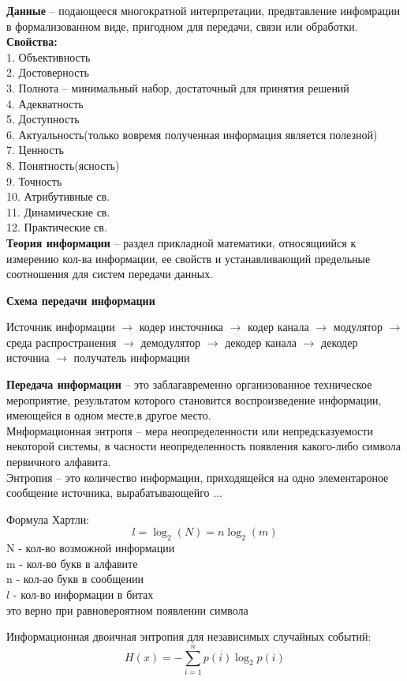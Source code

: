 \documentclass[a4paper, 12pt]{article}
\begin{document}
\textbf{Данные} -- подающееся многократной интерпретации, предвтавление инфомрации в формализованном виде, пригодном для передачи, связи или обработки.\\

\textbf{Свойства:}\\
1. Объективность\\
2. Достоверность\\
3. Полнота -- минимальный набор, достаточный для принятия решений\\
4. Адекватность \\
5. Доступность\\
6. Актуальность(только вовремя полученная информация является полезной)\\
7. Ценность\\
8. Понятность(ясность)\\
9. Точность\\
10. Атрибутивные св.\\
11. Динамические св.\\
12. Практические св.\\


\textbf{Теория информации} -- раздел прикладной математики, относящиийся к измерению кол-ва информации, ее свойств и устанавливающий предельные соотношения для систем передачи данных.\\
\begin{mdframed}[backgroundcolor=blue!20] 
       
  
\textbf{Схема передачи информации}

Источник информации $\to$ кодер инсточника $\to$ кодер канала $\to$ модулятор $\to$ среда распространения $\to$ демодулятор $\to$ декодер канала $\to$ декодер источниа $\to$ получатель информации
\end{mdframed}

\textbf{Передача информации} -- это заблагавременно организованное техническое мероприятие, результатом которого становится воспроизведение информации, имеющейся в одном месте,в другое место.\\

Мнформационная энтропя -- мера неопределенности или непредсказуемости некоторой системы, в часности неопределенность появления какого-либо символа первичного алфавита.\\
Энтропия -- это количество информации, приходящейся на одно элементароное сообщение источника, вырабатывающейго ...\\

\begin{mdframed}[backgroundcolor=blue!20] 
       Формула Хартли:\\
       \[l = \log_2 (N) = n \log_2 (m)\]
       N - кол-во возможной информации\\
       m - кол-во букв в алфавите\\
       n - кол-ао букв в сообщении\\
       $ l $ - кол-во информации в битах\\
       это верно при равновероятном появлении символа\\
    \end{mdframed}



\begin{mdframed}[backgroundcolor=blue!20] 
       Информационная двоичная энтропия для независимых случайных событий:\\
       \[
       	H(x) = -\sum_{i=1}^n p(i) \log_2 p(i)
       \]
    \end{mdframed}
\end{document}
